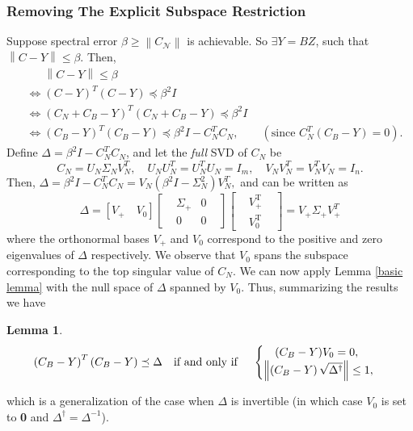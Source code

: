 \documentclass[11pt]{article}
\newtheorem{lemma}[theorem]{Lemma}
\renewcommand{\math}[1]{$#1$}
\newcommand{\norm}[1]{\left\|#1\right\|}
\newcommand{\Leq}{\preceq}
\newcommand{\N}{\mathcal{N}}
\begin{document}
\subsubsection{Removing The Explicit Subspace Restriction}
Suppose spectral error $\beta \geq \norm{C_{\N}}$ is achievable. So
 $\exists Y = BZ$, such that $\norm{C - Y} \leq \beta$. Then,
\begin{align*}
&\phantom{\iff}\norm{C - Y} \leq \beta \\[3pt]
& \iff \left( {C} - {Y} \right)^T \left( {C} - {Y} \right) 
\Leq \beta^2 I \\
& \iff \left( {C}_N + {C}_B - {Y} \right)^T \left( {C}_N + {C}_B - {Y} \right) \Leq \beta^2 I \\
& \iff \left( {C}_B - {Y} \right)^T \left( {C}_B - {Y} \right) \Leq \beta^2 I - {C}_N ^T {C}_N, \qquad (\text{since }  {C}_N^T({C}_B - {Y})=0).
\end{align*}
Define 
$\Delta = \beta^2 I - {C}_N ^T {C}_N$, and let the \emph{full} SVD of $C_N$ be 
\[ C_N = U_N\Sigma_NV_N^T, \quad U_NU_N^T=U_N^TU_N=I_m, \quad V_NV_N^T = V_N^TV_N = I_n. \]
Then, $\Delta = \beta^2 I - {C}_N ^T {C}_N = V_N(\beta^2I - \Sigma_N^2)V_N^T,$ and can be written as
\[ \Delta =  [  V_+ \quad V_0  ]
\begin{bmatrix}
&\Sigma_+ & 0 &\\
&0 & 0&
\end{bmatrix}
\begin{bmatrix}
&V_+^{\text{T}}&\\
&V_0^{\text{T}}&
\end{bmatrix} = V_+ \Sigma_+ V_+^T \]
where the orthonormal bases $V_+$ and $V_0$ correspond to the positive and zero eigenvalues of $\Delta$ respectively. We observe that
\math{V_0} spans the subspace corresponding to the top singular
value of \math{C_N}.
We can now apply Lemma \ref{basic lemma} with the null space of 
$\Delta$ spanned by $V_0$. Thus, summarizing the results we have
\begin{lemma}\label{combined}
\begin{eqnarray}\label{equation not invert}
\left( {C}_B - {Y} \right)^T \left( {C}_B - {Y} \right) \Leq \Delta 
\text{\quad if and only if \quad }
\begin{cases}
\quad (C_B - Y)V_0 = 0, \\
\norm{\left( {C}_B - {Y} \right) \sqrt{\Delta^{\dagger}} } \leq 1,
\end{cases}
\end{eqnarray}
\end{lemma}
\noindent which is a generalization of the case when \math{\Delta} is invertible (in which case \math{V_0} is set to \textbf{0} and \math{\Delta^\dagger=\Delta^{-1}}).
\end{document}
